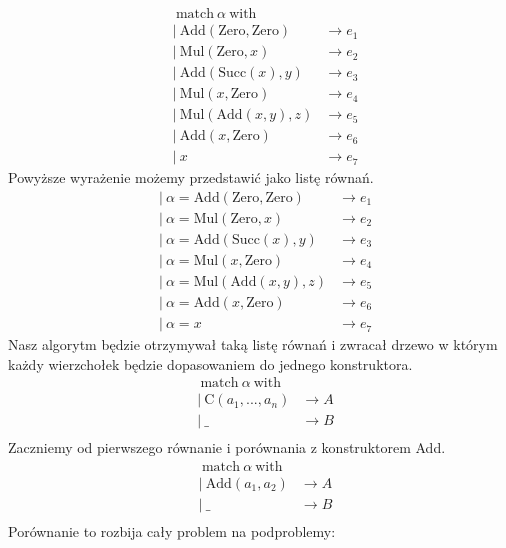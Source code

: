 \documentclass{article}
\begin{document}
\begin{align*}
   & \ \text{match}\ \alpha\ \text{with}                       \\
   & |\ \text{Add}(\text{Zero}, \text{Zero}) & \rightarrow e_1 \\
   & |\ \text{Mul}(\text{Zero}, x)           & \rightarrow e_2 \\
   & |\ \text{Add}(\text{Succ}(x), y)        & \rightarrow e_3 \\
   & |\ \text{Mul}(x, \text{Zero})           & \rightarrow e_4 \\
   & |\ \text{Mul}(\text{Add}(x,y), z)       & \rightarrow e_5 \\
   & |\ \text{Add}(x,\text{Zero})            & \rightarrow e_6 \\
   & |\ x                                    & \rightarrow e_7
\end{align*}
Powyższe wyrażenie możemy przedstawić jako listę równań.
\begin{align*}
   & |\ \alpha = \text{Add}(\text{Zero}, \text{Zero}) & \rightarrow e_1 \\
   & |\ \alpha = \text{Mul}(\text{Zero}, x)           & \rightarrow e_2 \\
   & |\ \alpha = \text{Add}(\text{Succ}(x), y)        & \rightarrow e_3 \\
   & |\ \alpha = \text{Mul}(x, \text{Zero})           & \rightarrow e_4 \\
   & |\ \alpha = \text{Mul}(\text{Add}(x,y), z)       & \rightarrow e_5 \\
   & |\ \alpha = \text{Add}(x,\text{Zero})            & \rightarrow e_6 \\
   & |\ \alpha = x                                    & \rightarrow e_7
\end{align*}
Nasz algorytm będzie otrzymywał taką listę równań i zwracał drzewo w którym każdy wierzchołek będzie dopasowaniem do jednego konstruktora.
\begin{align*}
   & \ \text{match}\ \alpha\ \text{with}                 \\
   & |\  \text{C}(a_1,..., a_n)          & \rightarrow A \\
   & |\ \_                               & \rightarrow B \\
\end{align*}
Zaczniemy od pierwszego równanie i porównania z konstruktorem Add.
\begin{align*}
   & \ \text{match}\ \alpha\ \text{with}                 \\
   & |\  \text{Add}(a_1, a_2)            & \rightarrow A \\
   & |\ \_                               & \rightarrow B \\
\end{align*}
Porównanie to rozbija cały problem na podproblemy:
\end{document}

